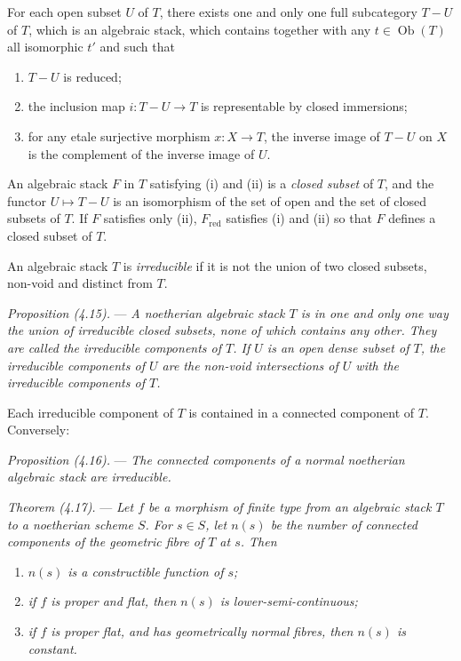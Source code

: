 \documentclass[10pt]{article}
\begin{document}
For each open subset $U$ of $T$, there exists one and only one full subcategory $T-U$ of $T$, which is an algebraic stack, which contains together with any $t\in\operatorname{Ob}(T)$ all isomorphic $t'$ and such that
\begin{enumerate}[label=(\roman*)]
\item $T-U$ is reduced;
\item the inclusion map $i:T-U\to T$ is representable by closed immersions;
\item for any etale surjective morphism $x:X\to T$, the inverse image of $T-U$ on $X$ is the complement of the inverse image of $U$.
\end{enumerate}

An algebraic stack $F$ in $T$ satisfying (i) and (ii) is a \emph{closed subset} of $T$, and the functor $U\mapsto T-U$ is an isomorphism of the set of open and the set of closed subsets of $T$. If $F$ satisfies only (ii), $F_{\mathrm{red}}$ satisfies (i) and (ii) so that $F$ defines a closed subset of $T$.

An algebraic stack $T$ is \emph{irreducible} if it is not the union of two closed subsets, non-void and distinct from $T$.

\medskip
\noindent\emph{Proposition (4.15).} --- \emph{A noetherian algebraic stack $T$ is in one and only one way the union of irreducible closed subsets, none of which contains any other. They are called the irreducible components of $T$. If $U$ is an open dense subset of $T$, the irreducible components of $U$ are the non-void intersections of $U$ with the irreducible components of $T$.}

Each irreducible component of $T$ is contained in a connected component of $T$. Conversely:

\medskip
\noindent\emph{Proposition (4.16).} --- \emph{The connected components of a normal noetherian algebraic stack are irreducible.}

\medskip
\noindent\emph{Theorem (4.17).} --- \emph{Let $f$ be a morphism of finite type from an algebraic stack $T$ to a noetherian scheme $S$. For $s\in S$, let $n(s)$ be the number of connected components of the geometric fibre of $T$ at $s$. Then}
\begin{enumerate}[label=(\roman*)]
\item \emph{$n(s)$ is a constructible function of $s$;}
\item \emph{if $f$ is proper and flat, then $n(s)$ is lower-semi-continuous;}
\item \emph{if $f$ is proper flat, and has geometrically normal fibres, then $n(s)$ is constant.}
\end{enumerate}
\end{document}
